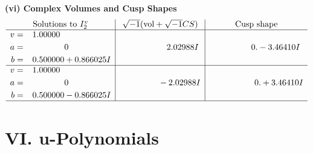 \documentclass[1p]{elsarticle_modified}
\theoremstyle{definition}
\newcommand{\I}{\sqrt{-1}}
\begin{document}
\newpage\flushleft \textbf{(vi) Complex Volumes and Cusp Shapes}
$$\begin{array}{c|c|c}  
\text{Solutions to }I^v_{2}& \I (\text{vol} + \sqrt{-1}CS) & \text{Cusp shape}\\
 \hline 
\begin{aligned}
v &= \phantom{-}1.00000\phantom{ +0.000000I} \\
a &= \phantom{-0.000000 } 0 \\
b &= \phantom{-}0.500000 + 0.866025 I\end{aligned}
 & \phantom{-0.000000 -}2.02988 I & \phantom{-0.000000 } 0. - 3.46410 I \\ \hline\begin{aligned}
v &= \phantom{-}1.00000\phantom{ +0.000000I} \\
a &= \phantom{-0.000000 } 0 \\
b &= \phantom{-}0.500000 - 0.866025 I\end{aligned}
 & \phantom{-0.000000 } -2.02988 I & \phantom{-0.000000 -}0. + 3.46410 I\\
 \hline 
 \end{array}$$\newpage
\newpage\renewcommand{\arraystretch}{1}
\centering \section*{ VI. u-Polynomials}
\end{document}
